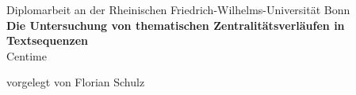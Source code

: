 \documentclass[a4paper]{scrreprt}
\begin{document}
\thispagestyle{empty}
\begin{center}
\vfill {Diplomarbeit an der Rheinischen Friedrich-Wilhelms-Universität Bonn \\ \vspace{16pt}
\huge \textbf{Die Untersuchung von thematischen Zentralitätsverläufen in Textsequenzen} \\ \vspace{16pt}\Large Centime \\\vspace{12pt}\begin{normalsize}vorgelegt von Florian Schulz\end{normalsize}}
\end{center}

\vfill {$\;$%
}
\vfill {$\;$}
\end{document}
